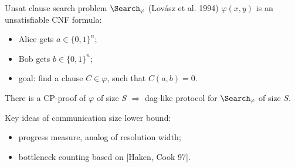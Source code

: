 \begin{frame}{Unsat clause search problem $\Search_{\varphi}$ (Lov{\'{a}}sz et al. 1994)}
    $\varphi(x, y)$ is an unsatisfiable CNF formula:
    \begin{itemize}
        \item Alice gets $a \in \{0, 1\}^n$;
        \item Bob gets $b \in \{0, 1\}^n$;
        \item goal: find a clause $C \in \varphi$, such that $C(a, b) = 0$.
    \end{itemize}

    \pause
    \vspace{0.7cm}

    \pause
    \begin{theorem}
        There is a CP-proof of $\varphi$ of size $S$ $\Rightarrow$ \alert{dag-like} protocol for
        $\Search_{\varphi}$ of size $S$.
    \end{theorem}

    \pause
    \vspace{0.7cm}
    Key ideas of communication \alert{size} lower bound:
    \begin{itemize}
        \item progress measure, analog of resolution width;
        \item bottleneck counting based on [Haken, Cook 97].
    \end{itemize}
\end{frame}


